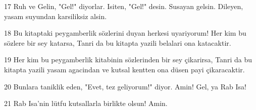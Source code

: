 \par 17 Ruh ve Gelin, "Gel!" diyorlar. Isiten, "Gel!" desin. Susayan gelsin. Dileyen, yasam suyundan karsiliksiz alsin.
\par 18 Bu kitaptaki peygamberlik sözlerini duyan herkesi uyariyorum! Her kim bu sözlere bir sey katarsa, Tanri da bu kitapta yazili belalari ona katacaktir.
\par 19 Her kim bu peygamberlik kitabinin sözlerinden bir sey çikarirsa, Tanri da bu kitapta yazili yasam agacindan ve kutsal kentten ona düsen payi çikaracaktir.
\par 20 Bunlara taniklik eden, "Evet, tez geliyorum!" diyor. Amin! Gel, ya Rab Isa!
\par 21 Rab Isa'nin lütfu kutsallarla birlikte olsun! Amin.


